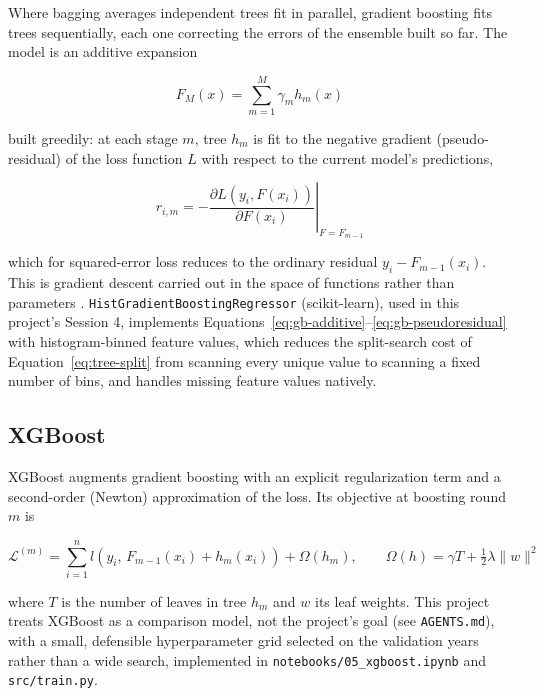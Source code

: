 Where bagging averages independent trees fit in parallel, gradient
boosting fits trees sequentially, each one correcting the errors of the
ensemble built so far. The model is an additive expansion

\begin{equation}
\label{eq:gb-additive}
F_M(x) = \sum_{m=1}^{M} \gamma_m h_m(x)
\end{equation}

built greedily: at each stage $m$, tree $h_m$ is fit to the negative
gradient (pseudo-residual) of the loss function $L$ with respect to the
current model's predictions,

\begin{equation}
\label{eq:gb-pseudoresidual}
r_{i,m} = -\left.
\frac{\partial L(y_i, F(x_i))}{\partial F(x_i)}
\right|_{F=F_{m-1}}
\end{equation}

which for squared-error loss reduces to the ordinary residual
$y_i - F_{m-1}(x_i)$. This is gradient descent carried out in the space of
functions rather than parameters \cite{friedman2001greedy}.
\texttt{HistGradientBoostingRegressor} (scikit-learn), used in this
project's Session 4, implements
Equations~\ref{eq:gb-additive}--\ref{eq:gb-pseudoresidual} with
histogram-binned feature values, which reduces the split-search cost of
Equation~\ref{eq:tree-split} from scanning every unique value to scanning
a fixed number of bins, and handles missing feature values natively.

\subsection{XGBoost}
\label{sec:xgboost}

XGBoost augments gradient boosting with an explicit regularization term
and a second-order (Newton) approximation of the loss. Its objective at
boosting round $m$ is

\begin{equation}
\label{eq:xgb-objective}
\mathcal{L}^{(m)} =
\sum_{i=1}^n l\!\left(y_i,\, F_{m-1}(x_i) + h_m(x_i)\right)
+ \Omega(h_m),
\qquad
\Omega(h) = \gamma T + \tfrac{1}{2}\lambda \|w\|^2
\end{equation}

where $T$ is the number of leaves in tree $h_m$ and $w$ its leaf weights.
This project treats XGBoost as a comparison model, not the project's goal
(see \texttt{AGENTS.md}), with a small, defensible hyperparameter grid
selected on the validation years rather than a wide search, implemented
in \texttt{notebooks/05\_xgboost.ipynb} and \texttt{src/train.py}.

